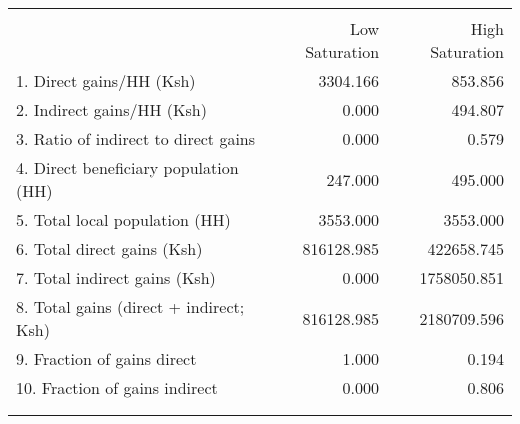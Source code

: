 \begin{tabular}{lrr}
\\[-1.8ex]\hline 
 \hline \\[-1.8ex]
 & Low Saturation & High Saturation \\
\midrule
1. Direct gains/HH (Ksh) & 3304.166 & 853.856 \\
2. Indirect gains/HH (Ksh) & 0.000 & 494.807 \\
3. Ratio of indirect to direct gains & 0.000 & 0.579 \\
4. Direct beneficiary population (HH) & 247.000 & 495.000 \\
5. Total local population (HH) & 3553.000 & 3553.000 \\
6. Total direct gains (Ksh) & 816128.985 & 422658.745 \\
7. Total indirect gains (Ksh) & 0.000 & 1758050.851 \\
8. Total gains (direct + indirect; Ksh) & 816128.985 & 2180709.596 \\
9. Fraction of gains direct & 1.000 & 0.194 \\
10. Fraction of gains indirect & 0.000 & 0.806 \\
\\[-1.8ex]\hline 
 \hline \\[-1.8ex]
\end{tabular}
